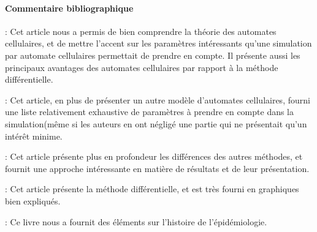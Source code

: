 \documentclass{article}
\begin{document}

\lstset{breaklines=true}

%

%



\newpage

\paragraph{Commentaire bibliographique\\}
\noindent
\cite{ref} : Cet article nous a permis de bien comprendre la théorie des automates cellulaires, et de mettre l'accent sur les paramètres intéressants qu'une simulation par automate cellulaires permettait de prendre en compte. Il présente aussi les principaux avantages des automates cellulaires par rapport à la méthode différentielle.

\cite{ref2} : Cet article, en plus de présenter un autre modèle d'automates cellulaires, fourni une liste relativement exhaustive de paramètres à prendre en compte dans la simulation(même si les auteurs en ont négligé une partie qui ne présentait qu'un  intérêt minime.

\cite{ref3} : Cet article présente plus en profondeur les différences des autres méthodes,  et fournit une approche intéressante en matière de résultats et de leur présentation.

\cite{ref4} : Cet article présente la méthode différentielle, et est très fourni en graphiques bien expliqués.

\cite{ref5} : Ce livre nous a fournit des éléments sur l'histoire de l'épidémiologie.

\newpage




\end{document}
